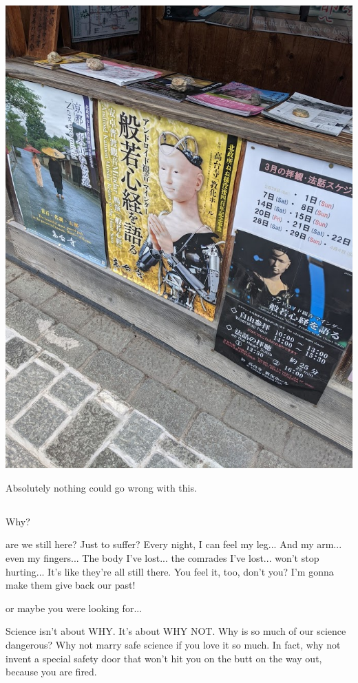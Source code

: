 \documentclass[letterpaper, 10pt,DIV=13]{scrartcl}
\numberwithin{equation}{section} %
\numberwithin{figure}{section} %
\numberwithin{table}{section} %
\begin{document}
\begin{center}
    \includegraphics[scale=.55]{MVIMG_20200320_122141.jpg}
\end{center}

Absolutely nothing could go wrong with this.

\subsection{}
Why?

are we still here? Just to suffer? Every night, I can feel my leg... And my arm... even my fingers... The body I've lost... the comrades I've lost... won't stop hurting... It's like they're all still there. You feel it, too, don't you? I'm gonna make them give back our past!

or maybe you were looking for...

Science isn't about WHY. It's about WHY NOT. Why is so much of our science dangerous? Why not marry safe science if you love it so much. In fact, why not invent a special safety door that won't hit you on the butt on the way out, because you are fired.
\end{document}
